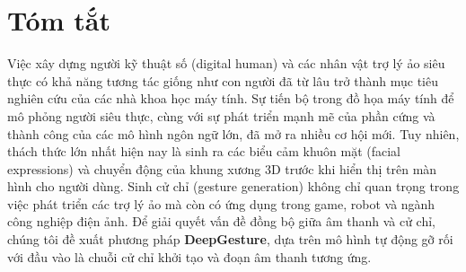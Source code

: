 \chapter*{Tóm tắt}
\label{abstract}

Việc xây dựng người kỹ thuật số (digital human) và các nhân vật trợ lý ảo siêu thực có khả năng tương tác giống như con người đã từ lâu trở thành mục tiêu nghiên cứu của các nhà khoa học máy tính. Sự tiến bộ trong đồ họa máy tính để mô phỏng người siêu thực, cùng với sự phát triển mạnh mẽ của phần cứng và thành công của các mô hình ngôn ngữ lớn, đã mở ra nhiều cơ hội mới. Tuy nhiên, thách thức lớn nhất hiện nay là sinh ra các biểu cảm khuôn mặt (facial expressions) và chuyển động của khung xương 3D  trước khi hiển thị trên màn hình cho người dùng. 
Sinh cử chỉ (gesture generation) không chỉ quan trọng trong việc phát triển các trợ lý ảo mà còn có ứng dụng trong game, robot và ngành công nghiệp điện ảnh. Để giải quyết vấn đề đồng bộ giữa âm thanh và cử chỉ, chúng tôi đề xuất phương pháp \textbf{DeepGesture}, dựa trên mô hình tự động gỡ rối với đầu vào là chuỗi cử chỉ khởi tạo và đoạn âm thanh tương ứng.


%


